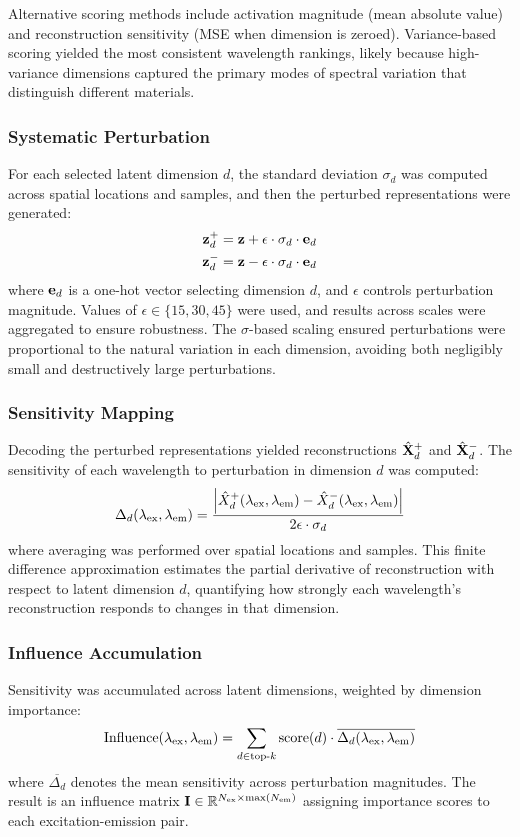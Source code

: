 Alternative scoring methods include activation magnitude (mean absolute value) and reconstruction sensitivity (MSE when dimension is zeroed).
Variance-based scoring yielded the most consistent wavelength rankings, likely because high-variance dimensions captured the primary modes of spectral variation that distinguish different materials.

\subsubsection{Systematic Perturbation}
For each selected latent dimension $d$, the standard deviation $\sigma_d$ was computed across spatial locations and samples, and then the perturbed representations were generated:
\begin{align}
\mathbf{z}^{+}_d &= \mathbf{z} + \epsilon \cdot \sigma_d \cdot \mathbf{e}_d \label{eq:perturb_pos}\\
\mathbf{z}^{-}_d &= \mathbf{z} - \epsilon \cdot \sigma_d \cdot \mathbf{e}_d \label{eq:perturb_neg}
\end{align}
where $\mathbf{e}_d$ is a one-hot vector selecting dimension $d$, and $\epsilon$ controls perturbation magnitude.
Values of $\epsilon \in \{15, 30, 45\}$ were used, and results across scales were aggregated to ensure robustness.
The $\sigma$-based scaling ensured perturbations were proportional to the natural variation in each dimension, avoiding both negligibly small and destructively large perturbations.

\subsubsection{Sensitivity Mapping}
Decoding the perturbed representations yielded reconstructions $\hat{\mathbf{X}}^{+}_d$ and $\hat{\mathbf{X}}^{-}_d$.
The sensitivity of each wavelength to perturbation in dimension $d$ was computed:
\begin{equation}
\Delta_d(\lambda_{\text{ex}}, \lambda_{\text{em}}) = \frac{\left| \hat{X}^{+}_d(\lambda_{\text{ex}}, \lambda_{\text{em}}) - \hat{X}^{-}_d(\lambda_{\text{ex}}, \lambda_{\text{em}}) \right|}{2\epsilon \cdot \sigma_d}
\label{eq:sensitivity}
\end{equation}
where averaging was performed over spatial locations and samples.
This finite difference approximation estimates the partial derivative of reconstruction with respect to latent dimension $d$, quantifying how strongly each wavelength's reconstruction responds to changes in that dimension.

\subsubsection{Influence Accumulation}
Sensitivity was accumulated across latent dimensions, weighted by dimension importance:
\begin{equation}
\text{Influence}(\lambda_{\text{ex}}, \lambda_{\text{em}}) = \sum_{d \in \text{top-}k} \text{score}(d) \cdot \overline{\Delta_d(\lambda_{\text{ex}}, \lambda_{\text{em}})}
\label{eq:influence}
\end{equation}
where $\overline{\Delta_d}$ denotes the mean sensitivity across perturbation magnitudes.
The result is an influence matrix $\mathbf{I} \in \mathbb{R}^{N_{\text{ex}} \times \max(N_{\text{em}})}$ assigning importance scores to each excitation-emission pair.

